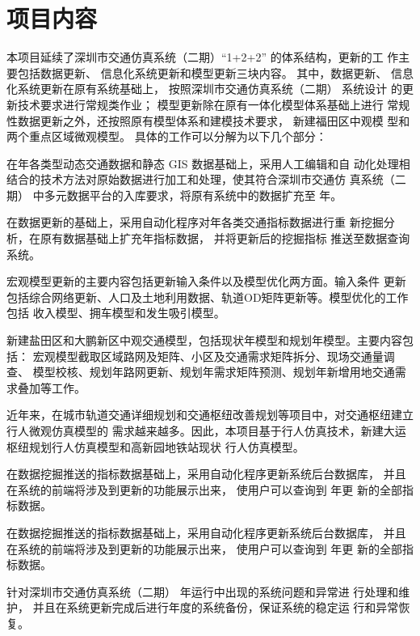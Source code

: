 \section{项目内容}
本项目延续了深圳市交通仿真系统（二期）“1+2+2” 的体系结构，更新的工
作主要包括数据更新、 信息化系统更新和模型更新三块内容。 其中，数据更新、
信息化系统更新在原有系统基础上， 按照深圳市交通仿真系统（二期） 系统设计
的更新技术要求进行常规类作业； 模型更新除在原有一体化模型体系基础上进行
常规性数据更新之外，还按照原有模型体系和建模技术要求， 新建福田区中观模
型和两个重点区域微观模型。 具体的工作可以分解为以下几个部分：

在\pyear 年各类型动态交通数据和静态 GIS 数据基础上，采用人工编辑和自
动化处理相结合的技术方法对原始数据进行加工和处理，使其符合深圳市交通仿
真系统（二期） 中多元数据平台的入库要求，将原有系统中的数据扩充至 \pyear
年。

在数据更新的基础上，采用自动化程序对\pyear 年各类交通指标数据进行重
新挖掘分析，在原有数据基础上扩充\pyear 年指标数据， 并将更新后的挖掘指标
推送至数据查询系统。

宏观模型更新的主要内容包括更新输入条件以及模型优化两方面。输入条件
更新包括综合网络更新、人口及土地利用数据、轨道OD矩阵更新等。模型优化的工作包括
收入模型、拥车模型和发生吸引模型。

新建盐田区和大鹏新区中观交通模型，包括现状年模型和规划年模型。主要内容包括：
宏观模型截取区域路网及矩阵、小区及交通需求矩阵拆分、现场交通量调查、
模型校核、规划年路网更新、规划年需求矩阵预测、规划年新增用地交通需求叠加等工作。

近年来，在城市轨道交通详细规划和交通枢纽改善规划等项目中，对交通枢纽建立行人微观仿真模型的
需求越来越多。因此，本项目基于行人仿真技术，新建大运枢纽规划行人仿真模型和高新园地铁站现状
行人仿真模型。

在数据挖掘推送的指标数据基础上，采用自动化程序更新系统后台数据库，
并且在系统的前端将涉及到更新的功能展示出来， 使用户可以查询到 \pyear 年更
新的全部指标数据。

在数据挖掘推送的指标数据基础上，采用自动化程序更新系统后台数据库，
并且在系统的前端将涉及到更新的功能展示出来， 使用户可以查询到 \pyear 年更
新的全部指标数据。

针对深圳市交通仿真系统（二期） \pyear 年运行中出现的系统问题和异常进
行处理和维护， 并且在系统更新完成后进行年度的系统备份，保证系统的稳定运
行和异常恢复。

